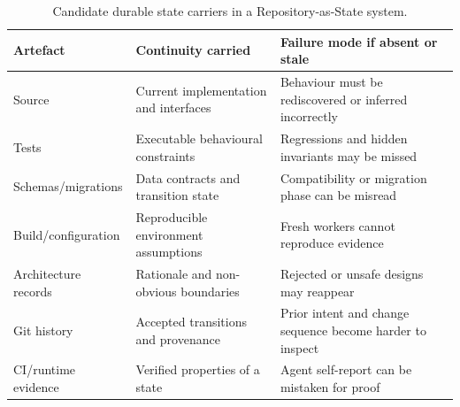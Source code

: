\begin{table}[htbp]
\centering
\small
\caption{Candidate durable state carriers in a Repository-as-State system.}
\label{tab:state-artifacts}
\begin{tabularx}{\textwidth}{@{}lX X@{}}
\toprule
Artefact & Continuity carried & Failure mode if absent or stale \\
\midrule
Source & Current implementation and interfaces & Behaviour must be rediscovered or inferred incorrectly \\
Tests & Executable behavioural constraints & Regressions and hidden invariants may be missed \\
Schemas/migrations & Data contracts and transition state & Compatibility or migration phase can be misread \\
Build/configuration & Reproducible environment assumptions & Fresh workers cannot reproduce evidence \\
Architecture records & Rationale and non-obvious boundaries & Rejected or unsafe designs may reappear \\
Git history & Accepted transitions and provenance & Prior intent and change sequence become harder to inspect \\
CI/runtime evidence & Verified properties of a state & Agent self-report can be mistaken for proof \\
\bottomrule
\end{tabularx}
\end{table}
